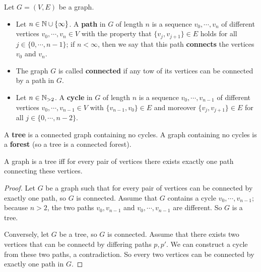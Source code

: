 \begin{definition}[]
    Let $G= (V,E)$ be a graph.
    \begin{itemize}
    \setlength\itemsep{-.2em}
        \item  Let $n \in \mathbb{N} \cup \{\infty\} $. A \textbf{path} in $G$ of length $n$ is a sequence $v_0, \cdots ,v_n $ of different vertices $v_0, \cdots ,v_n \in V$ with the property that $\{v_j , v_{j+1}\}  \in E$ holds for all $j \in \{0,\cdots ,n-1\} $; if $n < \infty$, then we say that this path \textbf{connects} the vertices $v_0$ and $v_n $.
        \item The graph $G$ is called \textbf{connected} if any tow of its vertices can be connected by a path in $G$.
        \item Let $n \in \mathbb{N} _{>2}$. A \textbf{cycle} in $G$ of length $n$ is a sequence $v_0, \cdots ,v_{n-1}$ of different vertices $v_0, \cdots ,v_{n-1} \in  V$ with $\{v_{n-1},v_0\} \in  E$ and moreover $\{v_j , v_{j+1}\} \in E$ for all $j \in \{0,\cdots ,n-2\} $.
    \end{itemize}
\end{definition}
\begin{definition}[]
    A \textbf{tree} is a connected graph containing no cycles. A graph containing no cycles is a \textbf{forest} (so a tree is a connected forest).
\end{definition}
\begin{prop}
    A graph is a tree iff for every pair of vertices there exists exactly one path connecting these vertices.
\end{prop}
\begin{proof}
    Let $G$ be a graph such that for every pair of vertices can be connected by exactly one path, so $G$ is connected. Assume that $G$ contains a cycle $v_0, \cdots ,v_{n-1}$; because $n>2$, the two paths $v_0, v_{n-1}$ and $v_0, \cdots ,v_{n-1}$ are different. So $G$ is a tree.

    Conversely, let $G$ be a tree, so $G$ is connected. Assume that there exists two vertices that can be connectd by differing paths $p, p'$. We can construct a cycle from these two paths, a contradiction. So every two vertices can be connected by exactly one path in $G$.
\end{proof}

